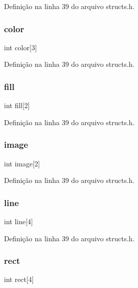 Definição na linha 39 do arquivo structs.\+h.

\mbox{\label{structespec__s_adce4b4ebd102c93a7a018ca96ad51024}} 
\subsubsection{color}
{\footnotesize\ttfamily int color[3]}



Definição na linha 39 do arquivo structs.\+h.

\mbox{\label{structespec__s_ac9dc84034f98e1da6eba7ca6a297eac2}} 
\subsubsection{fill}
{\footnotesize\ttfamily int fill[2]}



Definição na linha 39 do arquivo structs.\+h.

\mbox{\label{structespec__s_aec11110033e78905cfa49de8500c830a}} 
\subsubsection{image}
{\footnotesize\ttfamily int image[2]}



Definição na linha 39 do arquivo structs.\+h.

\mbox{\label{structespec__s_a66e704bf29f7731ed753a569b4143071}} 
\subsubsection{line}
{\footnotesize\ttfamily int line[4]}



Definição na linha 39 do arquivo structs.\+h.

\mbox{\label{structespec__s_af8ba022bbbc10da9fd796276cec918e3}} 
\subsubsection{rect}
{\footnotesize\ttfamily int rect[4]}




